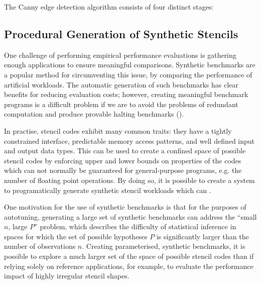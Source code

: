 The Canny edge detection algorithm consists of four distinct stages:


\subsection{Procedural Generation of Synthetic Stencils}

One challenge of performing empirical performance evaluations is
gathering enough applications to ensure meaningful
comparisons. Synthetic benchmarks are a popular method for
circumventing this issue, by comparing the performance of artificial
workloads. The automatic generation of such benchmarks has clear
benefits for reducing evaluation costs; however, creating meaningful
benchmark programs is a difficult problem if we are to avoid the
problems of redundant computation and produce provable halting
benchmarks ().

In practise, stencil codes exhibit many common traits: they have a
tightly constrained interface, predictable memory access patterns, and
well defined input and output data types. This can be used to create a
confined space of possible stencil codes by enforcing upper and lower
bounds on properties of the codes which can not normally be guaranteed
for general-purpose programs, e.g. the number of floating point
operations. By doing so, it is possible to create a system to
programatically generate synthetic stencil workloads which can
\TODO{\ldots}.

One motivation for the use of synthetic benchmarks is that for the
purposes of autotuning, generating a large set of synthetic benchmarks
can address the ``small $n$, large $P$'' problem, which describes the
difficulty of statistical inference in spaces for which the set of
possible hypotheses $P$ is significantly larger than the number of
observations $n$\CitationNeeded{}. Creating parameterised, synthetic
benchmarks, it is possible to explore a much larger set of the space
of possible stencil codes than if relying solely on reference
applications, for example, to evaluate the performance impact of
highly irregular stencil shapes.


